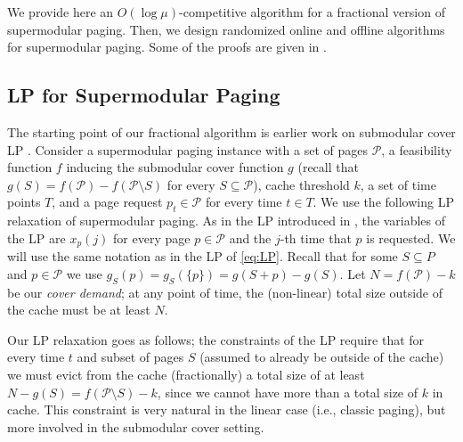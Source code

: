 \documentclass[11pt]{article}
\newcommand{\cP}{{\mathcal{P}}}
\newcommand{\cS}{{\mathcal{S}}}
\begin{document}
We provide here an $O(\log \mu)$-competitive algorithm for a fractional version of supermodular paging. Then, we design randomized online and offline algorithms for supermodular paging. %
Some of the proofs are given in . %

\subsection{LP for Supermodular Paging}

The starting point of our fractional algorithm is earlier work on submodular cover LP \cite{wolsey1982analysis,gupta2020online,coester2022competitive}. Consider a supermodular paging instance with a set of pages $\cP$, a feasibility function $f$ inducing the submodular cover function $g$ (recall that $g(S) = f(\cP)-f(\cP \setminus S)$ for every $S \subseteq \cP$), cache threshold $k$, a set of time points $T$, and a page request $p_t \in \cP$ for every time $t \in T$. We use the following LP relaxation of supermodular paging. As in the LP introduced in , the variables of the LP are $x_{p}(j)$ for every page $p \in \cP$ and the $j$-th time that $p$ is requested. We will use the same notation as in the LP of \eqref{eq:LP}. Recall that for some $S \subseteq P$ and $p \in \cP$ we use $g_S(p) = g_S(\{p\}) = g(S+p)-g(S)$. Let $N = f(\cP)-k$ be our {\em cover demand}; at any point of time, the (non-linear) total size outside of the cache must be at least $N$. 

Our LP relaxation goes as follows; the constraints of the LP require that for every time $t$ and subset of pages $S$ (assumed to already be outside of the cache) we must evict from the cache (fractionally) a total size of at least $N-g(S) = f \left(\cP\setminus S\right)-k$, since we cannot have more than a total size of $k$ in cache. This constraint is very natural in the linear case (i.e., classic paging), but more involved in the submodular cover setting. 
   
\end{document}
